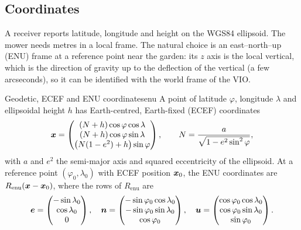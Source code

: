 \subsection*{Coordinates}

A receiver reports latitude, longitude and height on the WGS84
ellipsoid. The mower needs metres in a local frame. The natural choice
is an east--north--up (ENU) frame at a reference point near the garden:
its $z$ axis is the local vertical, which is the direction of gravity
up to the deflection of the vertical (a few arcseconds), so it can be
identified with the world frame of the VIO.

\begin{proposition}{Geodetic, ECEF and ENU coordinates}{enu}
A point of latitude $\varphi$, longitude $\lambda$ and ellipsoidal height
$h$ has Earth-centred, Earth-fixed (ECEF) coordinates
\begin{equation}\label{eq:ecef}
\bm{x}=\begin{pmatrix}(N+h)\cos\varphi\cos\lambda\\(N+h)\cos\varphi
\sin\lambda\\\bigl(N(1-e^2)+h\bigr)\sin\varphi\end{pmatrix},\qquad
N=\frac{a}{\sqrt{1-e^2\sin^2\varphi}},
\end{equation}
with $a$ and $e^2$ the semi-major axis and squared eccentricity of the
ellipsoid. At a reference point $(\varphi_0,\lambda_0)$ with ECEF
position $\bm{x}_0$, the ENU coordinates are $R_{\mathrm{enu}}(\bm{x}-
\bm{x}_0)$, where the rows of $R_{\mathrm{enu}}$ are
\begin{equation}\label{eq:renu}
\bm{e}=\begin{pmatrix}-\sin\lambda_0\\\cos\lambda_0\\0\end{pmatrix},\quad
\bm{n}=\begin{pmatrix}-\sin\varphi_0\cos\lambda_0\\-\sin\varphi_0
\sin\lambda_0\\\cos\varphi_0\end{pmatrix},\quad
\bm{u}=\begin{pmatrix}\cos\varphi_0\cos\lambda_0\\\cos\varphi_0
\sin\lambda_0\\\sin\varphi_0\end{pmatrix}.
\end{equation}
\end{proposition}

